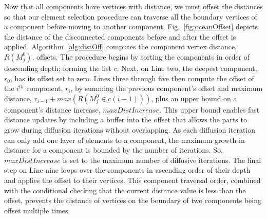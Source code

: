 Now that all components have vertices with distance, we must offset the
distances so that our element selection procedure can traverse all the
boundary vertices of a component before moving to another component.
Fig.~\ref{fig:oceanOffset} depicts the distance of
the disconnected components before and after the offset is applied.
Algorithm~\ref{alg:distOff} computes the component vertex
distance, $R(M^0_j)$, offsets.
The procedure begins by sorting the components in order of descending depth;
forming the list $c$.
Next, on Line two, the deepest component, $r_0$, has its offset set to zero.
Lines three through five then compute the offset of the $i^{th}$ component,
$r_i$, by summing the previous component's offset and maximum distance, $r_{i-1} + max(R(M^0_j
\in c(i-1)))$, plus an upper bound on a component's distance increase,
$maxDistIncrease$.
This upper bound enables fast distance updates by including a buffer into the
offset that allows the parts to grow during diffusion iterations without
overlapping.
As each diffusion iteration can only add one layer of elements to a
component, the maximum growth in distance for a component is bounded by
the number of iterations.
So, $maxDistIncrease$ is set to the maximum number of diffusive iterations.
The final step on Line nine loops over the components in ascending order of
their depth and applies the offset to their vertices.
This component traversal order, combined with the conditional checking that the
current distance value is less than the offset, prevents the distance of
vertices on the boundary of two components being offset multiple times.

